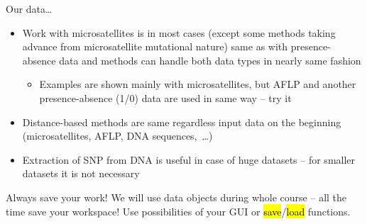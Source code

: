 \documentclass[compress, ucs, xelatex, 11pt, xcolor=svgnames,
  hyperref={
    bookmarks=true,
    unicode=true,
    colorlinks=true,
    pdftitle={Molecular data in R},
    plainpages=false,
    pdfauthor={Vojtech Zeisek},
    pdfsubject={Course about phylogeny and evolution in R},
    pdfcreator={XeLaTeX},
    pdfkeywords={R, evolution, phylogeny, molecular data},
    linkcolor=Tomato,
    anchorcolor=SaddleBrown,
    citecolor=Goldenrod,
    filecolor=DarkMagenta,
    menucolor=Sienna,
    urlcolor=DarkTurquoise,
    pdftex},
  url={hyphens, lowtilde} %
  ]{beamer}
\renewcommand{\texttt}[1]{\hl{\ttfamily #1}}
\begin{document}
\begin{frame}{Our data\ldots}
  \begin{itemize}
    \item Work with microsatellites is in most cases (except some methods taking advance from microsatellite mutational nature) same as with presence-absence data and methods can handle both data types in nearly same fashion
    \begin{itemize}
      \item Examples are shown mainly with microsatellites, but AFLP and another presence-absence (1/0) data are used in same way -- try it
    \end{itemize}
    \item Distance-based methods are same regardless input data on the beginning (microsatellites, AFLP, DNA sequences,~\ldots)
    \item Extraction of SNP from DNA is useful in case of huge datasets -- for smaller datasets it is not necessary
  \end{itemize}
  \begin{block}{Always save your work!}
    \alert{We will use data objects during whole course -- all the time save your workspace!} Use possibilities of your GUI or \texttt{save}/\texttt{load} functions.
  \end{block}
\end{frame}
\end{document}
